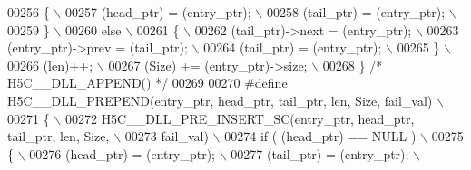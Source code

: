 \begin{DoxyCode}
00256 \textcolor{preprocessor}{    \{                                                                       \(\backslash\)}
00257 \textcolor{preprocessor}{       (head\_ptr) = (entry\_ptr);                                            \(\backslash\)}
00258 \textcolor{preprocessor}{       (tail\_ptr) = (entry\_ptr);                                            \(\backslash\)}
00259 \textcolor{preprocessor}{    \}                                                                       \(\backslash\)}
00260 \textcolor{preprocessor}{    else                                                                    \(\backslash\)}
00261 \textcolor{preprocessor}{    \{                                                                       \(\backslash\)}
00262 \textcolor{preprocessor}{       (tail\_ptr)->next = (entry\_ptr);                                      \(\backslash\)}
00263 \textcolor{preprocessor}{       (entry\_ptr)->prev = (tail\_ptr);                                      \(\backslash\)}
00264 \textcolor{preprocessor}{       (tail\_ptr) = (entry\_ptr);                                            \(\backslash\)}
00265 \textcolor{preprocessor}{    \}                                                                       \(\backslash\)}
00266 \textcolor{preprocessor}{    (len)++;                                                                \(\backslash\)}
00267 \textcolor{preprocessor}{    (Size) += (entry\_ptr)->size;                                            \(\backslash\)}
00268 \textcolor{preprocessor}{\} }\textcolor{comment}{/* H5C\_\_DLL\_APPEND() */}\textcolor{preprocessor}{}
00269 
00270 \textcolor{preprocessor}{#define H5C\_\_DLL\_PREPEND(entry\_ptr, head\_ptr, tail\_ptr, len, Size, fail\_val) \(\backslash\)}
00271 \textcolor{preprocessor}{\{                                                                            \(\backslash\)}
00272 \textcolor{preprocessor}{    H5C\_\_DLL\_PRE\_INSERT\_SC(entry\_ptr, head\_ptr, tail\_ptr, len, Size,         \(\backslash\)}
00273 \textcolor{preprocessor}{                           fail\_val)                                         \(\backslash\)}
00274 \textcolor{preprocessor}{    if ( (head\_ptr) == NULL )                                                \(\backslash\)}
00275 \textcolor{preprocessor}{    \{                                                                        \(\backslash\)}
00276 \textcolor{preprocessor}{       (head\_ptr) = (entry\_ptr);                                             \(\backslash\)}
00277 \textcolor{preprocessor}{       (tail\_ptr) = (entry\_ptr);                                             \(\backslash\)}

\end{DoxyCode}
